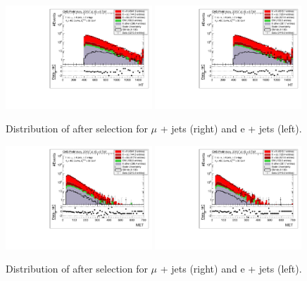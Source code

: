\begin{figure}[ht!]
\centering
    \includegraphics[clip, trim=0.15cm 0.15cm 0.15cm 0.1cm, width=0.49\textwidth]{images/Run1/HT_SelectedJets_StackLogY_Mu.pdf}
     \includegraphics[clip, trim=0.15cm 0.15cm 0.15cm 0.1cm, width=0.49\textwidth]{images/Run1/HT_SelectedJets_StackLogY_e.pdf}          
    \caption{Distribution of \HT after selection for $\mu$ + jets (right) and e + jets (left). }
    \label{fig:datasimHT}
\end{figure}

\begin{figure}[ht!]
\centering
    \includegraphics[clip, trim=0.15cm 0.15cm 0.15cm 0.1cm, width=0.49\textwidth]{images/Run1/MET_StackLogY_Mu.pdf}
     \includegraphics[clip, trim=0.15cm 0.15cm 0.15cm 0.1cm, width=0.49\textwidth]{images/Run1/MET_StackLogY_e.pdf}          
    \caption{Distribution of \MET after selection for $\mu$ + jets (right) and e + jets (left). }
    \label{fig:datasimMET}
\end{figure}



